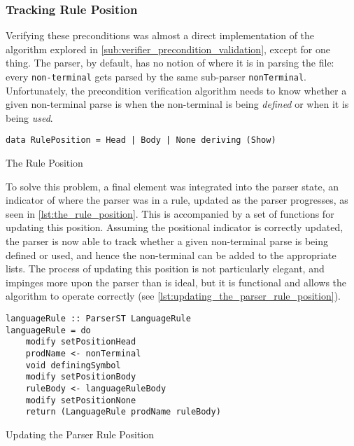 \subsubsection{Tracking Rule Position} %
\label{ssub:tracking_rule_position}

Verifying these preconditions was almost a direct implementation of the algorithm explored in \autoref{sub:verifier_precondition_validation}, except for one thing. 
The parser, by default, has no notion of where it is in parsing the file: every \texttt{non-terminal} gets parsed by the same sub-parser \texttt{nonTerminal}. 
Unfortunately, the precondition verification algorithm needs to know whether a given non-terminal parse is when the non-terminal is being \textit{defined} or when it is being \textit{used}. 

\begin{listing}[!htb]
\begin{verbatim}
data RulePosition = Head | Body | None deriving (Show)
\end{verbatim}
\caption{The Rule Position}
\label{lst:the_rule_position}
\end{listing}

To solve this problem, a final element was integrated into the parser state, an indicator of where the parser was in a rule, updated as the parser progresses, as seen in \autoref{lst:the_rule_position}.
This is accompanied by a set of functions for updating this position.
Assuming the positional indicator is correctly updated, the parser is now able to track whether a given non-terminal parse is being defined or used, and hence the non-terminal can be added to the appropriate lists.
The process of updating this position is not particularly elegant, and impinges more upon the parser than is ideal, but it is functional and allows the algorithm to operate correctly (see \autoref{lst:updating_the_parser_rule_position}).

\begin{listing}[!htb]
\begin{verbatim}
languageRule :: ParserST LanguageRule
languageRule = do
    modify setPositionHead
    prodName <- nonTerminal
    void definingSymbol
    modify setPositionBody
    ruleBody <- languageRuleBody
    modify setPositionNone
    return (LanguageRule prodName ruleBody)
\end{verbatim}
\caption{Updating the Parser Rule Position}
\label{lst:updating_the_parser_rule_position}
\end{listing}

